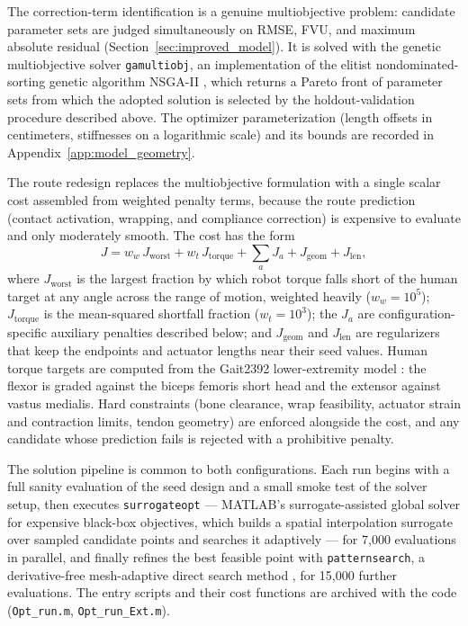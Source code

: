 The correction-term identification is a genuine multiobjective problem: candidate parameter sets are judged simultaneously on RMSE, FVU, and maximum absolute residual (Section~\ref{sec:improved_model}). It is solved with the genetic multiobjective solver \texttt{gamultiobj}, an implementation of the elitist nondominated-sorting genetic algorithm NSGA-II \citep{deb_nsga2_2002, mathworks_optimization_2025}, which returns a Pareto front of parameter sets from which the adopted solution is selected by the holdout-validation procedure described above. The optimizer parameterization (length offsets in centimeters, stiffnesses on a logarithmic scale) and its bounds are recorded in Appendix~\ref{app:model_geometry}.

The route redesign replaces the multiobjective formulation with a single scalar cost assembled from weighted penalty terms, because the route prediction (contact activation, wrapping, and compliance correction) is expensive to evaluate and only moderately smooth. The cost has the form
\begin{equation}
    J = w_{w}\,J_{\text{worst}} + w_{t}\,J_{\text{torque}} + \textstyle\sum_{a} J_{a} + J_{\text{geom}} + J_{\text{len}},
    \label{eq:opt_cost}
\end{equation}
where $J_{\text{worst}}$ is the largest fraction by which robot torque falls short of the human target at any angle across the range of motion, weighted heavily ($w_{w} = 10^{5}$); $J_{\text{torque}}$ is the mean-squared shortfall fraction ($w_{t} = 10^{3}$); the $J_{a}$ are configuration-specific auxiliary penalties described below; and $J_{\text{geom}}$ and $J_{\text{len}}$ are regularizers that keep the endpoints and actuator lengths near their seed values. Human torque targets are computed from the Gait2392 lower-extremity model \citep{delp_opensim_2007, seth_opensim_2018}: the flexor is graded against the biceps femoris short head and the extensor against vastus medialis. Hard constraints (bone clearance, wrap feasibility, actuator strain and contraction limits, tendon geometry) are enforced alongside the cost, and any candidate whose prediction fails is rejected with a prohibitive penalty.

The solution pipeline is common to both configurations. Each run begins with a full sanity evaluation of the seed design and a small smoke test of the solver setup, then executes \texttt{surrogateopt} --- MATLAB's surrogate-assisted global solver for expensive black-box objectives, which builds a spatial interpolation surrogate over sampled candidate points and searches it adaptively \citep{mathworks_optimization_2025} --- for 7,000 evaluations in parallel, and finally refines the best feasible point with \texttt{patternsearch}, a derivative-free mesh-adaptive direct search method \citep{audet_mads_2006, mathworks_optimization_2025}, for 15,000 further evaluations. The entry scripts and their cost functions are archived with the code (\texttt{Opt\_run.m}, \texttt{Opt\_run\_Ext.m}).

